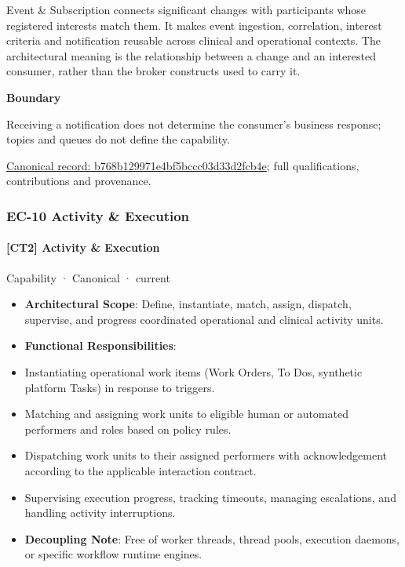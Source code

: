 Event \& Subscription connects significant changes with participants whose registered interests match them. It makes event ingestion, correlation, interest criteria and notification reusable across clinical and operational contexts. The architectural meaning is the relationship between a change and an interested consumer, rather than the broker constructs used to carry it.



\textbf{Boundary}



Receiving a notification does not determine the consumer's business response; topics and queues do not define the capability.


{\footnotesize \href{../../../../continuum/strategy/capability/b768b129971e4bf5bccc03d33d2fcb4e.md}{Canonical record: b768b129971e4bf5bccc03d33d2fcb4e}; full qualifications, contributions and provenance.}\par
\subsubsection{EC-10 Activity \& Execution}

\paragraph{[CT2] Activity \& Execution}

\label{element:e5ff80e655084524a8dcee8e4ded788a}
{\small Capability · Canonical · current}\par

\begin{itemize}


\item \textbf{Architectural Scope}: Define, instantiate, match, assign, dispatch, supervise, and progress coordinated operational and clinical activity units.

\item \textbf{Functional Responsibilities}:

\item Instantiating operational work items (Work Orders, To Dos, synthetic platform Tasks) in response to triggers.

\item Matching and assigning work units to eligible human or automated performers and roles based on policy rules.

\item Dispatching work units to their assigned performers with acknowledgement according to the applicable interaction contract.

\item Supervising execution progress, tracking timeouts, managing escalations, and handling activity interruptions.

\item \textbf{Decoupling Note}: Free of worker threads, thread pools, execution daemons, or specific workflow runtime engines.

\end{itemize}


